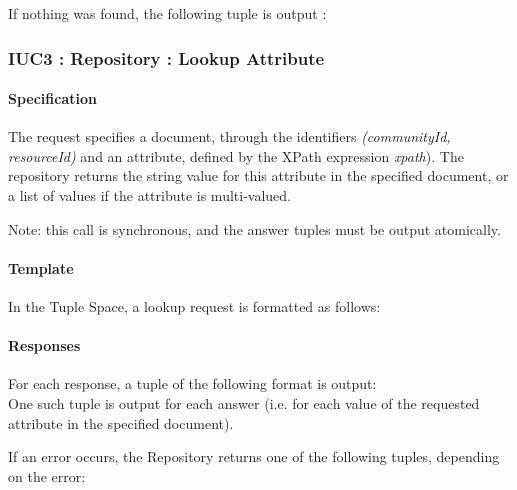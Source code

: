 \documentclass[titlepage]{article}%
\begin{document}
If nothing was found, the following tuple is output :
\begin{equation*}
[ \text{``SynchroLocalSearchResp"}; communityId; xpath; \text{``"} ] 
\end{equation*}

\subsubsection{IUC3 : Repository : Lookup Attribute}
\label{iuc3}
\paragraph{Specification}
The request specifies a document, through the identifiers \emph{(communityId, resourceId)} and an attribute, defined by the XPath expression \emph{xpath}). 
The repository returns the string value for this attribute in the specified document, or a list of values if the attribute is multi-valued.

Note: this call is synchronous, and the answer tuples must be output atomically.

\paragraph{Template}
In the Tuple Space, a lookup request is formatted as follows: 
\begin{equation*}
[\text{``LookupXpath"}; documentId; communityId; xpath]
\end{equation*}

\paragraph{Responses}

For each response, a tuple of the following format is output:
\begin{equation*}
[\text{``LookupXpath"}; documentId ; communityId; xpath ; answer]
\end{equation*}
One such tuple is output for each answer (i.e. for each value of the requested attribute in the specified document).

If an error occurs, the Repository returns one of the following tuples, depending on the error:
\begin{eqnarray*}
[\text{``LookupXpath"}; documentId ; communityId; xpath ; \text{``CommunityNotFound"]} \\  \text{[``LookupXpath"}; documentId; communityId; xpath; \text{``ResourceNotFound"}] 
\end{eqnarray*}
\end{document}
